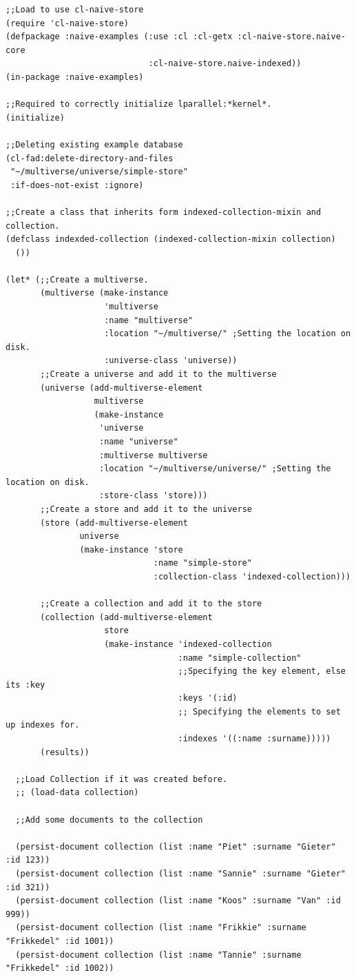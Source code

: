 \documentclass[11pt]{article}
\begin{document}
\begin{verbatim}
;;Load to use cl-naive-store
(require 'cl-naive-store)
(defpackage :naive-examples (:use :cl :cl-getx :cl-naive-store.naive-core
                             :cl-naive-store.naive-indexed))
(in-package :naive-examples)

;;Required to correctly initialize lparallel:*kernel*.
(initialize)

;;Deleting existing example database
(cl-fad:delete-directory-and-files
 "~/multiverse/universe/simple-store"
 :if-does-not-exist :ignore)

;;Create a class that inherits form indexed-collection-mixin and collection.
(defclass indexded-collection (indexed-collection-mixin collection)
  ())

(let* (;;Create a multiverse.
       (multiverse (make-instance
                    'multiverse
                    :name "multiverse"
                    :location "~/multiverse/" ;Setting the location on disk.
                    :universe-class 'universe))
       ;;Create a universe and add it to the multiverse
       (universe (add-multiverse-element
                  multiverse
                  (make-instance
                   'universe
                   :name "universe"
                   :multiverse multiverse
                   :location "~/multiverse/universe/" ;Setting the location on disk.
                   :store-class 'store)))
       ;;Create a store and add it to the universe
       (store (add-multiverse-element
               universe
               (make-instance 'store
                              :name "simple-store"
                              :collection-class 'indexed-collection)))

       ;;Create a collection and add it to the store
       (collection (add-multiverse-element
                    store
                    (make-instance 'indexed-collection
                                   :name "simple-collection"
                                   ;;Specifying the key element, else its :key
                                   :keys '(:id)
                                   ;; Specifying the elements to set up indexes for.
                                   :indexes '((:name :surname)))))
       (results))

  ;;Load Collection if it was created before.
  ;; (load-data collection)

  ;;Add some documents to the collection

  (persist-document collection (list :name "Piet" :surname "Gieter" :id 123))
  (persist-document collection (list :name "Sannie" :surname "Gieter" :id 321))
  (persist-document collection (list :name "Koos" :surname "Van" :id 999))
  (persist-document collection (list :name "Frikkie" :surname "Frikkedel" :id 1001))
  (persist-document collection (list :name "Tannie" :surname "Frikkedel" :id 1002))


\end{verbatim}
\end{document}
